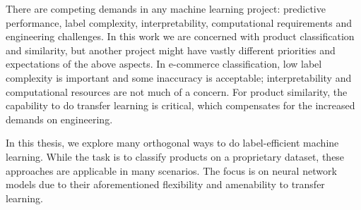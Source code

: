 There are competing demands in any machine learning project: predictive performance, label complexity, interpretability, computational requirements and engineering challenges.
In this work we are concerned with product classification and similarity, but another project might have vastly different priorities and expectations of the above aspects.
In e-commerce classification, low label complexity is important and some inaccuracy is acceptable; interpretability and computational resources are not much of a concern.
For product similarity, the capability to do transfer learning is critical, which compensates for the increased demands on engineering.


In this thesis, we explore many orthogonal ways to do label-efficient machine learning.
While the task is to classify products on a proprietary dataset, these approaches are applicable in many scenarios.
The focus is on neural network models due to their aforementioned flexibility and amenability to transfer learning.


